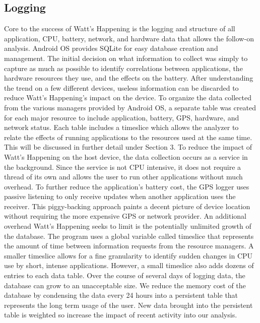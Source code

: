 \subsection*{Logging}
Core to the success of Watt's Happening is the logging and structure of all application, CPU, battery, network, and hardware data that allows the follow-on analysis.  
Android OS provides SQLite for easy database creation and management. 
The initial decision on what information to collect was simply to capture as much as possible to identify correlations between applications, the hardware resources they use, and the effects on the battery.  
After understanding the trend on a few different devices, useless information can be discarded to reduce Watt's Happening's impact on the device.
To organize the data collected from the various managers provided by Android OS, a separate table was created for each major resource to include application, battery, GPS, hardware, and network status.  
Each table includes a timeslice which allows the analyzer to relate the effects of running applications to the resources used at the same time.  
This will be discussed in further detail under Section 3.
To reduce the impact of Watt's Happening on the host device, the data collection occurs as a service in the background.  
Since the service is not CPU intensive, it does not require a thread of its own and allows 
the user to run other applications without much overhead.  
To further reduce the application's battery cost, the GPS logger uses passive listening to only receive updates when another application uses the receiver.  
This piggy-backing approach paints a decent picture of device location without requiring the more expensive GPS or network provider.
An additional overhead Watt's Happening seeks to limit is the potentially unlimited growth of the database.  
The program uses a global variable called timeslice that represents the amount of time between information requests from the resource managers.  
A smaller timeslice allows for a fine granularity to identify sudden changes in CPU use by short, intense applications.  
However, a small timeslice also adds dozens of entries to each data table. 
 Over the course of several days of logging data, the database can grow to an unacceptable size.  
We reduce the memory cost of the database by condensing the data every 24 hours into a persistent table that represents the long term usage of the user.  
New data brought into the persistent table is weighted so increase the impact of recent activity into our analysis.
